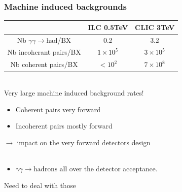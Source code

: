 \documentclass{beamer}
\begin{document}
\begin{frame}
\frametitle{Machine induced backgrounds}
\begin{center}
\begin{tabular}{ccc}
 & ILC 0.5TeV & CLIC 3TeV\\
\midrule
Nb $\gamma\gamma\to\textrm{had}$/BX & 0.2 & \alert{3.2}\\
\midrule
Nb incoherant pairs/BX & $1\times 10^5$ & \alert{$3\times10^5$}\\
\midrule
Nb coherent pairs/BX & $<10^2$ & $7\times 10^8$\\
\bottomrule
\end{tabular}
\end{center}
~\\
\alert{Very large machine induced background rates!}\\
\begin{itemize}
  \item Coherent pairs very forward
  \item Incoherent pairs mostly forward
\end{itemize}
$\to$ impact on the very forward detectors design\\
~\\
\begin{itemize}
  \item $\gamma\gamma\to\textrm{hadrons}$ all over the detector acceptance.
\end{itemize}
\alert{Need to deal with those}
\end{frame}
\end{document}
